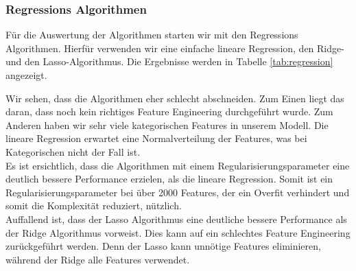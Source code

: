 \subsubsection{Regressions Algorithmen}
Für die Auswertung der Algorithmen starten wir mit den Regressions Algorithmen. Hierfür verwenden wir eine  einfache lineare Regression, den Ridge- und den Lasso-Algorithmus. Die Ergebnisse werden in Tabelle \ref{tab:regression} angezeigt.\\[2ex]
%
\begin{table}[ht]
\centering
{}
\caption{Ergebnisse der Regression Algorithmen}
\label{tab:regression}
\end{table}
%
Wir sehen, dass die Algorithmen eher schlecht abschneiden. Zum Einen liegt das daran, dass noch kein richtiges Feature Engineering durchgeführt wurde. Zum Anderen haben wir sehr viele kategorischen Features in unserem Modell. Die lineare Regression erwartet eine Normalverteilung der Features, was bei Kategorischen nicht der Fall ist.\\
Es ist ersichtlich, dass die Algorithmen mit einem Regularisierungsparameter eine deutlich bessere Performance erzielen, als die lineare Regression. Somit ist ein Regularisierungsparameter bei über 2000 Features, der ein Overfit verhindert und somit die Komplexität reduziert, nützlich.\\
Auffallend ist, dass der Lasso Algorithmus eine deutliche bessere Performance als der Ridge Algorithmus vorweist. Dies kann auf ein schlechtes Feature Engineering zurückgeführt werden. Denn der Lasso kann unnötige Features eliminieren, während der Ridge alle Features verwendet.
%
